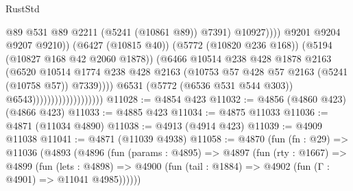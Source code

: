 \begin{lexlean}{RustStd}
\begin{coremodule}
                                                          @89
                                                          @531
                                                          @89
                                                          @2211
                                                          (@5241 (@10861 @89))
                                                          @7391)
                                                        @10927))))
                                                @9201
                                                @9204
                                                @9207
                                                @9210))
                                            (@6427 (@10815 @40))
                                            (@5772 (@10820 @236 @168))
                                            (@5194 (@10827 @168 @42 @2060 @1878))
                                            (@6466
                                              @10514
                                              @238
                                              @428
                                              @1878
                                              @2163
                                              (@6520
                                                @10514
                                                @1774
                                                @238
                                                @428
                                                @2163
                                                (@10753
                                                  @57
                                                  @428
                                                  @57
                                                  @2163
                                                  (@5241 (@10758 @57))
                                                  @7339))))
                                          @6531
                                          (@5772 (@6536 @531 @544 @303))
                                          @6543)))))))))))))))))))
@11028 := @4854 @423
@11032 := @4856 (@4860 @423) (@4866 @423)
@11033 := @4885 @423
@11034 := @4875 @11033
@11036 := @4871 (@11034 @4890)
@11038 := @4913 (@4914 @423)
@11039 := @4909 @11038
@11041 := @4871 (@11039 @4938)
@11058 := @4870
    (fun (fn : @29) =>
    @11036
      (@4893
        (@4896
          (fun (params : @4895) =>
          @4897
            (fun (rty : @1667) =>
            @4899
              (fun (lets : @4898) =>
              @4900 (fun (tail : @1884) => @4902 (fun (Γ : @4901) => @11041 @4985))))))

\end{coremodule}
\end{lexlean}

